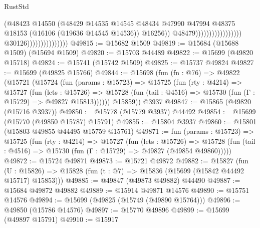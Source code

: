 \begin{lexlean}{RustStd}
\begin{coremodule}
                                                                    (@48423
                                                                      @14550
                                                                      (@48429
                                                                        @14535
                                                                        @14545
                                                                        @48434
                                                                        @47990
                                                                        @47994
                                                                        @48375
                                                                        @18153
                                                                        (@16106
                                                                          (@19636 @14545 @14536))
                                                                        @16256))
                                                                    @48479)))))))))))))))))
                                  @30126)))))))))))))))
@49815 := @15682 @1509
@49819 := @15684 (@15688 @1509) (@15694 @1509)
@49820 := @15703 @44489
@49822 := @15699 (@49820 @15718)
@49824 := @15741 (@15742 @1509)
@49825 := @15737 @49824
@49827 := @15699 (@49825 @15766)
@49844 := @15698
    (fun (fn : @76) =>
    @49822
      (@15721
        (@15724
          (fun (params : @15723) =>
          @15725
            (fun (rty : @4214) =>
            @15727
              (fun (lets : @15726) =>
              @15728 (fun (tail : @4516) => @15730 (fun (Γ : @15729) => @49827 @15813))))))
        @15859))
    @3937
@49847 := @15865 (@49820 (@15716 @3937))
@49850 := @15778 (@15779 @3937) @44492
@49854 := @15699 (@15770 (@49850 @15787) @15791)
@49855 := @15804 @3937
@49860 := @15801 (@15803 @49855 @44495 @15759 @15761)
@49871 := fun (params : @15723) =>
  @15725
    (fun (rty : @4214) =>
    @15727
      (fun (lets : @15726) =>
      @15728 (fun (tail : @4516) => @15730 (fun (Γ : @15729) => @49827 (@49854 @49860)))))
@49872 := @15724 @49871
@49873 := @15721 @49872
@49882 := @15827
    (fun (U : @15826) => @15828 (fun (t : @7) => @15836 (@15699 (@15842 @44492 @15717) @15853)))
@49885 := @49847 (@49873 @49882) @44490
@49887 := @15684 @49872 @49882
@49889 := @15914 @49871 @14576
@49890 := @15751 @14576
@49894 := @15699 (@49825 (@15749 (@49890 @15764)))
@49896 := @49850 (@15786 @14576)
@49897 := @15770 @49896
@49899 := @15699 (@49897 @15791)
@49910 := @15917

\end{coremodule}
\end{lexlean}

